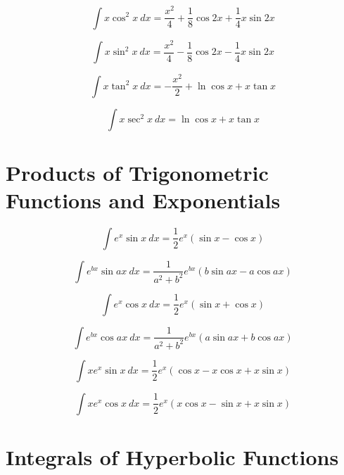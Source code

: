 \documentclass[12pt,a4paper,leqno]{article}
\begin{document}
  \begin{equation}
  \int x \cos^2 x \ dx = \frac{x^2}{4}+\frac{1}{8}\cos 2x + \frac{1}{4} x \sin 2x
  \end{equation}

  \begin{equation}
  \int x \sin^2 x \ dx = \frac{x^2}{4}-\frac{1}{8}\cos 2x - \frac{1}{4} x \sin 2x
  \end{equation}

  \begin{equation}
  \int x \tan^2 x \ dx = -\frac{x^2}{2} + \ln \cos x + x \tan x
  \end{equation}

  \begin{equation}
  \int x \sec^2 x \ dx = \ln \cos x + x \tan x
  \end{equation}

  \section*{Products of Trigonometric Functions and Exponentials}

  \begin{equation}
  \int e^x \sin x \ dx = \frac{1}{2}e^x (\sin x - \cos x)
  \end{equation}

  \begin{equation}\label{eq:ritzert}
  \int e^{bx} \sin ax\ dx = \frac{1}{a^2+b^2}e^{bx} (b\sin ax - a\cos ax)
  \end{equation}

  \begin{equation}
  \int e^x \cos x\ dx = \frac{1}{2}e^x (\sin x + \cos x)
  \end{equation}

  \begin{equation}
  \int e^{bx} \cos ax\ dx = \frac{1}{a^2 + b^2} e^{bx} ( a \sin ax + b \cos ax )
  \end{equation}

  \begin{equation}
  \int x e^x \sin x\ dx = \frac{1}{2}e^x (\cos x - x \cos x + x \sin x)
  \end{equation}

  \begin{equation}
  \int x e^x \cos x\ dx = \frac{1}{2}e^x (x \cos x
  - \sin x + x \sin x)
  \end{equation}

   \section*{Integrals of Hyperbolic Functions}
\end{document}
